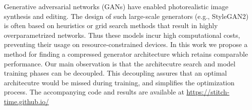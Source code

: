 
Generative adversarial networks (GANs) have enabled photorealistic image synthesis and editing.
The design of such large-scale generators (e.g., StyleGAN2) is often based on heuristics or grid search methods that result in highly overparametrized networks.
Thus these models incur high computational costs, preventing their usage on resource-constrained devices.
In this work we propose a method for finding a compressed generator architecture which retains comparable performance.
Our main observation is that the architecutre search and model training phases can be decoupled.
This decoupling assures that an optimal architecutre would be missed during training, and simplifies the optimization process.
The accompanying code and results are available at \url{https://stitch-time.github.io/}